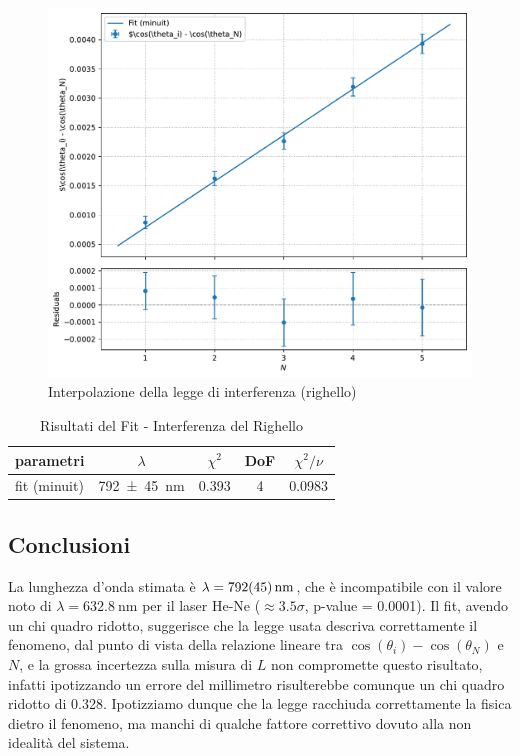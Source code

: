 \documentclass[a4paper]{article}
\begin{document}
\begin{figure}[htbp]
\centering
\includegraphics[width=1.0\textwidth]{./grafici/righello.pdf}
\caption{Interpolazione della legge di interferenza (righello)}
\label{fig:interferenza-righello-interpolazione}
\end{figure}

\begin{table}[htbp]
\caption{Risultati del Fit - Interferenza del Righello}
\label{tab:interferenza-righello-risultati}
\centering
\begin{tabular}{|l|cccc|}
\hline
parametri & $\lambda$ & $\chi^2$ & DoF & $\chi^2/\nu$ \\\hline\hline
fit (minuit) & \SI{792 \pm 45}{\nano\meter} & \num{0.393} & 4 & \num{0.0983} \\\hline
\end{tabular}
\end{table}

\subsection{Conclusioni}
La lunghezza d'onda stimata è $\lambda = \SI{792 \pm 45}{\nano\meter}$, che è incompatibile con il valore noto di $\lambda = \SI{632.8}{\nano\meter}$ per il laser He-Ne ($\approx \num{3.5} \sigma$, p-value = \num{0.0001}). Il fit, avendo un chi quadro ridotto, suggerisce che la legge usata descriva correttamente il fenomeno, dal punto di vista della relazione lineare tra $\cos(\theta_i) - \cos(\theta_N)$ e $N$, e la grossa incertezza sulla misura di $L$ non compromette questo risultato, infatti ipotizzando un errore del millimetro risulterebbe comunque un chi quadro ridotto di \num{0.328}. Ipotizziamo dunque che la legge racchiuda correttamente la fisica dietro il fenomeno, ma manchi di qualche fattore correttivo dovuto alla non idealità del sistema. 
\end{document}
